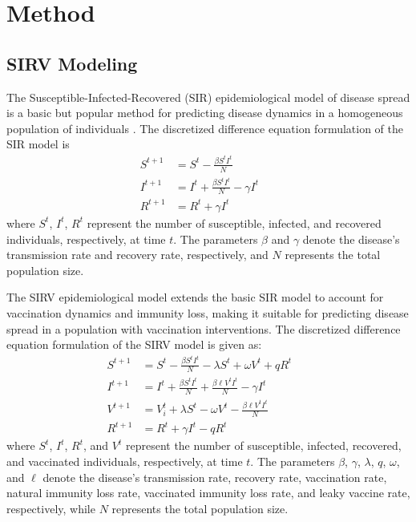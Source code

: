 \documentclass{article}
\begin{document}
\section{Method}
\subsection{SIRV Modeling}
The Susceptible-Infected-Recovered (SIR) epidemiological model of disease spread is a basic but popular method for predicting disease dynamics in a homogeneous population of individuals \parencite{longini1986generalized}. The discretized difference equation formulation of the SIR model is 
\begin{align*}
    S^{t+1} &= S^t - \frac{\beta S^t I^t}{N} &&\\ %
    I^{t+1} &= I^t + \frac{\beta S^t I^t}{N} - \gamma I^t &&\\ %
    R^{t+1} &= R^t + \gamma I^t && %
\end{align*}
where $S^t$, $I^t$, $R^t$ represent the number of susceptible, infected, and recovered individuals, respectively, at time $t$. The parameters $\beta$ and $\gamma$ denote the disease's transmission rate and recovery rate, respectively, and $N$ represents the total population size. 

The SIRV epidemiological model extends the basic SIR model to account for vaccination dynamics and immunity loss, making it suitable for predicting disease spread in a population with vaccination interventions. The discretized difference equation formulation of the SIRV model is given as:
\begin{align*}
    S^{t+1} &= S^t - \frac{\beta S^t I^t}{N} - \lambda S^t + \omega V^t + q R^t &&\\ %
    I^{t+1} &= I^t + \frac{\beta S^t I^t}{N} + \frac{\beta \ell V^t I^t}{N} - \gamma I^t &&\\%
    V^{t+1} &= V_i^t + \lambda S^{t} - \omega V^t - \frac{\beta \ell V^t I^t}{N} &&\\ %
    R^{t+1} &= R^t + \gamma I^t - q R^t && %
\end{align*}
where $S^t$, $I^t$, $R^t$, and $V^t$ represent the number of susceptible, infected, recovered, and vaccinated individuals, respectively, at time $t$. The parameters $\beta$, $\gamma$, $\lambda$, $q$, $\omega$, and $\ell$ denote the disease's transmission rate, recovery rate, vaccination rate, natural immunity loss rate, vaccinated immunity loss rate, and leaky vaccine rate, respectively, while $N$ represents the total population size.
\end{document}
